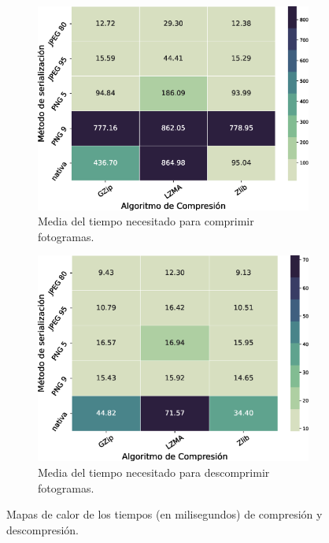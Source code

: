 \begin{figure}
	\centering
	
	\begin{subfigure}[b]{0.9\textwidth}
		\includegraphics[width=\textwidth]{img/TiempoMedioComp.eps}
		\caption{Media del tiempo necesitado para comprimir fotogramas.}
		\label{fig:heatmaptini}
	\end{subfigure}
	\begin{subfigure}[b]{0.9\textwidth}
		\includegraphics[width=\textwidth]{img/TiempoMedioDes.eps}
		\caption{Media del tiempo necesitado para descomprimir fotogramas.}
		\label{fig:heatmaptfin}
	\end{subfigure}
	\caption{Mapas de calor de los tiempos (en milisegundos) de compresión y descompresión.}
	\label{fig:resultsComp}
\end{figure}


